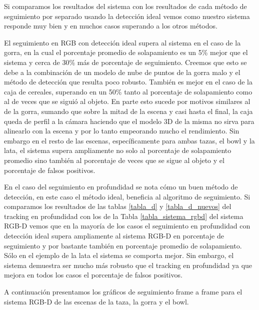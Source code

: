 Si comparamos los resultados del sistema con los resultados de cada método de seguimiento por separado usando la detección ideal vemos como nuestro sistema responde muy bien y en muchos casos superando a los otros métodos.

El seguimiento en RGB con detección ideal supera al sistema en el caso de la gorra, en la cual el porcentaje promedio de solapamiento es un 5\% mejor que el sistema y cerca de 30\% más de porcentaje de seguimiento. Creemos que esto se debe a la combinación de un modelo de nube de puntos de la gorra malo y el método de detección que resulta poco robusto. También es mejor en el caso de la caja de cereales, superando en un 50\% tanto al porcentaje de solapamiento como al de veces que se siguió al objeto. En parte esto sucede por motivos similares al de la gorra, sumando que sobre la mitad de la escena y casi hasta el final, la caja queda de perfil a la cámara haciendo que el modelo 3D de la misma no sirva para alinearlo con la escena y por lo tanto empeorando mucho el rendimiento. Sin embargo en el resto de las escenas, específicamente para ambas tazas, el bowl y la lata, el sistema supera ampliamente no solo al porcentaje de solapamiento promedio sino también al porcentaje de veces que se sigue al objeto y el porcentaje de falsos positivos.

En el caso del seguimiento en profundidad se nota cómo un buen método de detección, en este caso el método ideal, beneficia al algoritmo de seguimiento. Si comparamos los resultados de las tablas \ref{tabla_d} y \ref{tabla_d_nuevos} del tracking en profundidad con los de la Tabla \ref{tabla_sistema_rgbd} del sistema RGB-D vemos que en la mayoría de los casos el seguimiento en profundidad con detección ideal supera ampliamente al sistema RGB-D en porcentaje de seguimiento y por bastante también en porcentaje promedio de solapamiento. Sólo en el ejemplo de la lata el sistema se comporta mejor. Sin embargo, el sistema demuestra ser mucho más robusto que el tracking en profundidad ya que mejora en todos los casos el porcentaje de falsos positivos.

A continuación presentamos los gráficos de seguimiento frame a frame para el sistema RGB-D de las escenas de la taza, la gorra y el bowl.

